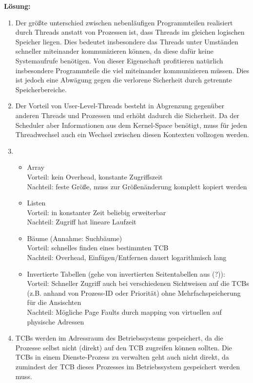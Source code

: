 \begin{description}
\textbf{Lösung:}\\
\begin{enumerate}
	\item Der größte unterschied zwischen nebenläufigen Programmteilen realisiert durch Threads anstatt von Prozessen ist, dass Threads im gleichen logischen Speicher liegen. Dies bedeutet insbesondere das Threads unter Umständen schneller miteinander kommunizieren können, da diese dafür keine Systemaufrufe benötigen.
Von dieser Eigenschaft profitieren natürlich insbesondere Programmteile die viel miteinander kommunizieren müssen. Dies ist jedoch eine Abwägung gegen die verlorene Sicherheit durch getrennte Speicherbereiche.
	\item Der Vorteil von User-Level-Threads besteht in Abgrenzung gegenüber anderen Threads und Prozessen und erhöht dadurch die Sicherheit. Da der Scheduler aber Informationen aus dem Kernel-Space benötigt, muss für jeden Threadwechsel auch ein Wechsel zwischen diesen Kontexten vollzogen werden.
	\item 
          \begin{itemize}
            \item Array\\
              Vorteil: kein Overhead, konstante Zugriffszeit\\
              Nachteil: feste Größe, muss zur Größenänderung komplett kopiert werden
            \item Listen\\
              Vorteil: in konstanter Zeit beliebig erweiterbar\\
              Nachteil: Zugriff hat lineare Laufzeit
            \item Bäume (Annahme: Suchbäume) \\
              Vorteil: schnelles finden eines bestimmten TCB\\
              Nachteil: Overhead, Einfügen/Entfernen dauert logarithmisch lang
            \item Invertierte Tabellen (gehe von invertierten Seitentabellen aus (?)):\\
              Vorteil: Schneller Zugriff auch bei verschiedenen Sichtweisen auf die TCBs (z.B. anhand von Prozess-ID oder Priorität) ohne Mehrfachspeicherung für die Ansischten\\
              Nachteil: Mögliche Page Faults durch mapping von virtuellen auf physische Adressen
          \end{itemize}
	\item TCBs werden im Adressraum des Betriebssystems gespeichert, da die Prozesse selbst nicht (direkt) auf den TCB zugreifen können sollten. Die TCBs in einem Dienste-Prozess zu verwalten geht auch nicht direkt, da zumindest der TCB dieses Prozesses im Betriebssystem gespeichert werden muss.
\end{enumerate}




\end{description}
